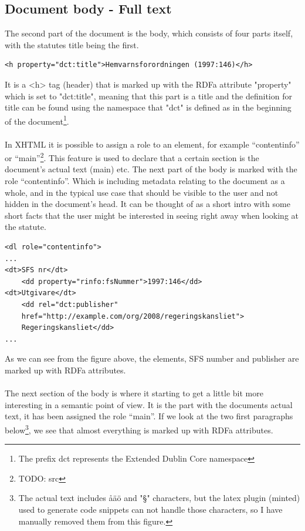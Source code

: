 \subsection{Document body - Full text}
The second part of the document is the body, which consists of four parts itself, with the statutes title being the first.\\
\begin{verbatim}
<h property="dct:title">Hemvarnsforordningen (1997:146)</h>
\end{verbatim}
\linebreak
It is a <h> tag (header) that is marked up with the RDFa attribute "property" which is set to "dct:title", meaning that this part is a title and the definition for title can be found using the namespace that "dct" is defined as in the beginning of the document\footnote{The prefix dct represents the Extended Dublin Core namespace}.\\\\
In XHTML it is possible to assign a role to an element, for example “contentinfo” or “main”\footnote{TODO: src}. This feature is used to declare that a certain section is the document’s actual text (main) etc. The next part of the body is marked with the role “contentinfo”. Which is including metadata relating to the document as a whole, and in the typical use case that should be visible to the user and not hidden in the document’s head. It can be thought of as a short intro with some short facts that the user might be interested in seeing right away when looking at the statute.\\
\begin{verbatim}
<dl role="contentinfo">
...
<dt>SFS nr</dt>
    <dd property="rinfo:fsNummer">1997:146</dd>
<dt>Utgivare</dt>
    <dd rel="dct:publisher" 
	href="http://example.com/org/2008/regeringskansliet">
	Regeringskansliet</dd>
...
\end{verbatim}
\linebreak
\newline
As we can see from the figure above, the elements, SFS number and publisher are marked up with RDFa attributes.\\\\
The next section of the body is where it starting to get a little bit more interesting in a semantic point of view. It is the part with the documents actual text, it has been assigned the role “main”. If we look at the two first paragraphs below\footnote{The actual text includes åäö and "§" characters, but the latex plugin (minted) used to generate code snippets can not handle those characters, so I have manually removed them from this figure.}, we see that almost everything is marked up with RDFa attributes.\\
